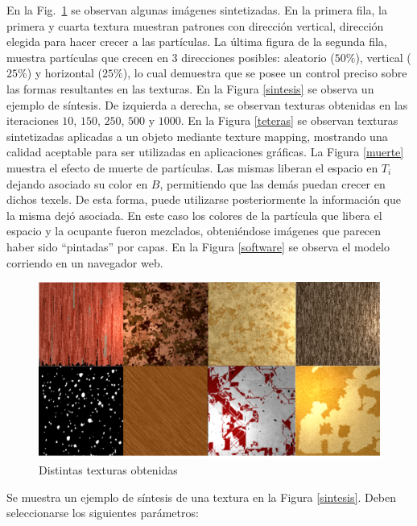 \documentclass[spanish,a4paper,11pt,oneside,links]{report}
\begin{document}
En la Fig.~\ref{resultados} se observan algunas im\'agenes sintetizadas.
En la primera fila, la primera y cuarta textura muestran patrones con direcci\'on vertical, direcci\'on elegida para hacer crecer a las part\'iculas.
La \'ultima figura de la segunda fila, muestra part\'iculas que crecen en 3 direcciones posibles: aleatorio ($50\%$), vertical ($25\%$) y horizontal ($25\%$), lo cual demuestra que se posee un control preciso sobre las formas resultantes en las texturas.
En la Figura \ref{sintesis} se observa un ejemplo de s\'intesis.
De izquierda a derecha, se observan texturas obtenidas en las iteraciones $10$, $150$, $250$, $500$ y $1000$.
En la Figura \ref{teteras} se observan texturas sintetizadas aplicadas a un objeto mediante texture mapping, mostrando una calidad aceptable para ser utilizadas en aplicaciones gr\'aficas.
La Figura \ref{muerte} muestra el efecto de muerte de part\'iculas.
Las mismas liberan el espacio en $T_{i}$ dejando asociado su color en $B$, permitiendo que las dem\'as puedan crecer en dichos texels.
De esta forma, puede utilizarse posteriormente la informaci\'on que la misma dej\'o asociada.
En este caso los colores de la part\'icula que libera el espacio y la ocupante fueron mezclados, obteni\'endose im\'agenes que parecen haber sido ``pintadas'' por capas.
En la Figura \ref{software} se observa el modelo corriendo en un navegador web.


\begin{figure}[t!]
\centering
\includegraphics[scale=0.18]{resultados}
\caption{Distintas texturas obtenidas}
\label{resultados}
\end{figure}

Se muestra un ejemplo de s\'intesis de una textura en la Figura \ref{sintesis}. Deben seleccionarse los siguientes par\'ametros:
\end{document}
